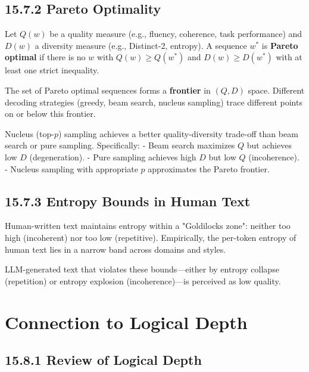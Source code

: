 \subsection{15.7.2 Pareto Optimality}

\begin{definition}
Let $Q(w)$ be a quality measure (e.g., fluency, coherence, task performance) and $D(w)$ a diversity measure (e.g., Distinct-2, entropy). A sequence $w^*$ is \textbf{Pareto optimal} if there is no $w$ with $Q(w) \geq Q(w^*)$ and $D(w) \geq D(w^*)$ with at least one strict inequality.

The set of Pareto optimal sequences forms a \textbf{frontier} in $(Q, D)$ space. Different decoding strategies (greedy, beam search, nucleus sampling) trace different points on or below this frontier.
\end{definition}

\begin{theorem}
Nucleus (top-$p$) sampling achieves a better quality-diversity trade-off than beam search or pure sampling. Specifically:
- Beam search maximizes $Q$ but achieves low $D$ (degeneration).
- Pure sampling achieves high $D$ but low $Q$ (incoherence).
- Nucleus sampling with appropriate $p$ approximates the Pareto frontier.
\end{theorem}

\subsection{15.7.3 Entropy Bounds in Human Text}

\begin{observation}[Holtzman et al., 2020]
Human-written text maintains entropy within a "Goldilocks zone": neither too high (incoherent) nor too low (repetitive). Empirically, the per-token entropy of human text lies in a narrow band across domains and styles.

LLM-generated text that violates these bounds---either by entropy collapse (repetition) or entropy explosion (incoherence)---is perceived as low quality.
\end{observation}



\section{Connection to Logical Depth}

\subsection{15.8.1 Review of Logical Depth}

